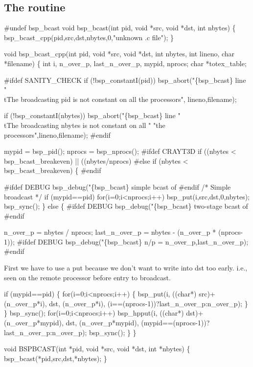 \subsection{The routine}

\begin{code}
#undef bsp_bcast
void bsp_bcast(int pid, void *src, void *dst, int nbytes) \{
  bsp_bcast_cpp(pid,src,dst,nbytes,0,"unknown .c file");
 \}

void bsp_bcast_cpp(int pid, void *src, void *dst, int nbytes,
		   int lineno, char *filename) \{
  int i, n_over_p, last_n_over_p, mypid, nprocs;
  char *totex_table;

#ifdef SANITY_CHECK
  if (!bsp_constantI(pid))
    bsp_abort("\{bsp_bcast\} line %
              "\\tThe broadcasting pid is not constant on all the processors",
	      lineno,filename);

  if (!bsp_constantI(nbytes))
    bsp_abort("\{bsp_bcast\} line %
              "\\tThe broadcasting nbytes is not constant on all "
              "the processors",lineno,filename);
#endif

  
  mypid       = bsp_pid();
  nprocs      = bsp_nprocs();
#ifdef CRAYT3D
  if ((nbytes < bsp_bcast_breakeven) || ((nbytes/nprocs)%
#else
  if (nbytes < bsp_bcast_breakeven) \{
#endif

#ifdef DEBUG
    bsp_debug("\{bsp_bcast\} simple bcast of %
#endif
    /* Simple broadcast */
    if (mypid==pid) 
      for(i=0;i<nprocs;i++) 
        bsp_put(i,src,dst,0,nbytes);
    bsp_sync();
  \} else \{
#ifdef DEBUG
    bsp_debug("\{bsp_bcast\} two-stage bcast of %
#endif

    n_over_p      = nbytes / nprocs;
    last_n_over_p = nbytes - (n_over_p * (nprocs-1));
#ifdef DEBUG
    bsp_debug("\{bsp_bcast\} n/p = %
              n_over_p,last_n_over_p);
#endif
\end{code}
First we have to use a put because we don't want to write into dst too
early. i.e., seen on the remote processor before entry to broadcast.
\begin{code}
    if (mypid==pid) \{
      for(i=0;i<nprocs;i++) \{
        bsp_put(i,
                ((char*) src)+(n_over_p*i),
                dst,
                (n_over_p*i),
                (i==(nprocs-1))?last_n_over_p:n_over_p);
      \}
    \}
    bsp_sync();
    for(i=0;i<nprocs;i++) 
      bsp_hpput(i,
                ((char*) dst)+(n_over_p*mypid),
                dst,
                (n_over_p*mypid),
                (mypid==(nprocs-1))?last_n_over_p:n_over_p);
    bsp_sync();       
  \}
 \}
\end{code}

\begin{code}
void BSPBCAST(int *pid, void *src, void *dst, int *nbytes) \{
  bsp_bcast(*pid,src,dst,*nbytes);
 \}
\end{code}

